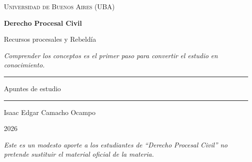 \documentclass[12pt,oneside]{book}
\newcommand{\universidad}{Universidad de Buenos Aires (UBA)}
\newcommand{\materia}{Derecho Procesal Civil}
\newcommand{\subtitulo}{Recursos procesales y Rebeld\'ia}
\newcommand{\autor}{Isaac Edgar Camacho Ocampo}
\newcommand{\anio}{2026}
\begin{document}
\begin{titlepage}

\thispagestyle{empty}

\begin{center}

\vspace*{1cm}

{\large \textsc{\universidad}}

\vspace{3cm}

{\Huge \textbf{\materia}}

\vspace{1cm}

{\LARGE \subtitulo}

\vspace{0.8cm}

\textit{Comprender los conceptos es el primer paso para convertir el estudio en conocimiento.}

\vspace{1.2cm}

\rule{0.70\textwidth}{0.5pt}

\vspace{0.5cm}

{\large Apuntes de estudio}

\vspace{0.5cm}

\rule{0.70\textwidth}{0.5pt}

\vfill

{\large \autor}

\vspace{0.3cm}

{\large \anio}

\end{center}

\vfill

\begin{flushleft}
\textit{Este es un modesto aporte a los estudiantes de ``Derecho Procesal Civil'' no pretende sustituir el material oficial de la materia.}
\end{flushleft}

\end{titlepage}

\tableofcontents

\end{document}
